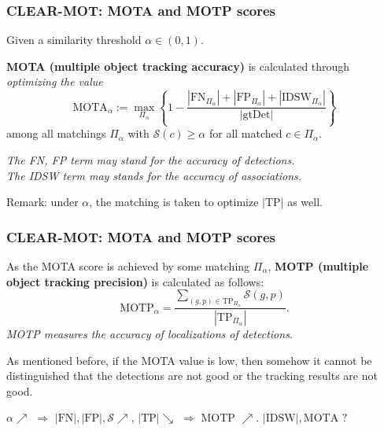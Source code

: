 \documentclass[slidetop, mathserif]{beamer}
\begin{document}

\begin{frame}
	\frametitle{CLEAR-MOT: MOTA and MOTP scores}
			
			
	Given a similarity threshold $\alpha\in (0,1)$.
			
	\vspace{4pt}
			
	{\bf MOTA (multiple object tracking accuracy)} is calculated through
	\emph{optimizing the value}
	\[
		\text{MOTA}_\alpha :=
		\max_{\Pi_\alpha}
		\left\{1 - \dfrac{|\text{FN}_{\Pi_\alpha}| + |\text{FP}_{\Pi_\alpha}| + |\text{IDSW}_{\Pi_\alpha}|}{|\text{gtDet}|}\right\}
	\]
	among all matchings $\Pi_\alpha$ with $\mathcal S(c)\geq \alpha$ for all matched $c\in\Pi_\alpha$.
			
	\vspace{4pt}
			
	\emph{\color{blue} The FN, FP term may stand for the accuracy of detections.} \\
	\emph{\color{olive} The IDSW term may stands for the accuracy of associations.}
			
	\vspace{4pt}
		
	Remark: under $\alpha$, the matching is taken to optimize $|\text{TP}|$ as well.
			
\end{frame}

\begin{frame}
	\frametitle{CLEAR-MOT: MOTA and MOTP scores}
			
	As the MOTA score is achieved by some matching $\Pi_\alpha$, {\bf MOTP (multiple object tracking precision)}
	is calculated as follows:
	\[
		\text{MOTP}_\alpha =
		\dfrac{\sum_{(g,p)\in\text{TP}_{\Pi_\alpha}}\mathcal S(g,p)}{|\text{TP}_{\Pi_\alpha}|}.
	\]
	\emph{\color{red} MOTP measures the accuracy of localizations of detections}.
			
	\quad
			
	As mentioned before, if the MOTA value is low,
	then somehow it cannot be distinguished that
	the detections are not good or the tracking results are not good.
			
	\vspace{5pt}
		
	$\alpha\nearrow$ $\Rightarrow$ $|\text{FN}|, |\text{FP}|, \mathcal S \nearrow$,
	$|\text{TP}| \searrow$ $\Rightarrow$ MOTP $\nearrow$.
	$|\text{IDSW}|, \text{MOTA}$ $?$
	
\end{frame}
\end{document}
